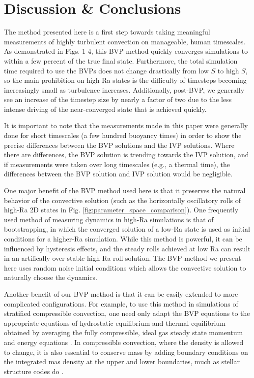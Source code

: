 \documentclass[aps, pre, onecolumn, nofootinbib, notitlepage, groupedaddress, amsfonts, amssymb, amsmath, longbibliography]{revtex4-1}
\begin{document}
\section{Discussion \& Conclusions}
\label{sec:discussion}
The method presented here is a first step towards taking meaningful measurements
of highly turbulent convection on manageable, human timescales.  As demonstrated in Figs.
1-4, this BVP method quickly converges simulations to within a few percent of the true final
state. Furthermore, the total simulation time required to use the BVPs does not change drastically from
low $S$ to high $S$, so the main prohibition on high Ra states is the difficulty of timesteps becoming
increasingly small as turbulence increases.  Additionally, post-BVP, we generally see an increase of the
timestep size by nearly a factor of two due to the less intense driving of the near-converged state that
is achieved quickly.  

It is important to note that the measurements made in
this paper were generally done for short timescales (a few hundred buoyancy times) in
order to show the precise differences between the BVP solutions and the IVP solutions.
Where there are differences, the BVP solution is trending towards the IVP solution,
and if measurements were taken over long timescales (e.g., a thermal time), the
differences between the BVP solution and IVP solution would be negligible.

One major benefit of the BVP method used here is that it preserves the natural behavior of 
the convective solution (such as the horizontally oscillatory rolls
of high-Ra 2D states in Fig. \ref{fig:parameter_space_comparison}).
One frequently used method of measuring dynamics in high-Ra simulations is that of bootstrapping,
in which the converged solution of a low-Ra state is used as initial conditions for a higher-Ra
simulation.  While this method is powerful, it can be influenced by hysteresis effects,
and the steady rolls achieved at low Ra can result in an artifically over-stable high-Ra
roll solution.  The BVP method we present here uses random noise initial conditions which allows the
convective solution to naturally choose the dynamics.

Another benefit of our BVP method is that it can be easily extended to more complicated
configurations.  For example, to use this method in simulations of stratified compressible convection,
one need only adapt the BVP equations to the appropriate equations of hydrostatic equilibrium
and thermal equilibrium obtained by averaging the fully compressible, ideal gas
steady state momentum and energy equations \cite{anders&brown2017, lecoanet&all2014}.
In compressible convection, where the density is allowed to change,
it is also essential to conserve mass by adding boundary conditions on the integrated mas density at
the upper and lower boundaries, much as stellar structure codes do \cite{paxton&all2011}.
\end{document}
